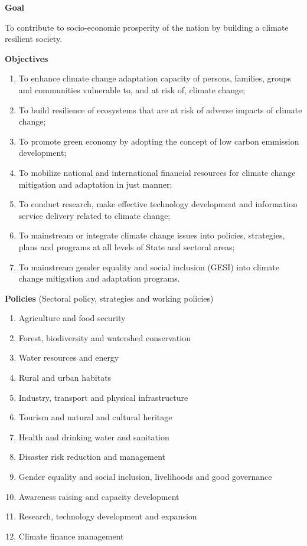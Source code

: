 \documentclass[
  openany]{book}
\providecommand{\tightlist}{%
  \setlength{\itemsep}{0pt}\setlength{\parskip}{0pt}}
\begin{document}
\textbf{Goal}

To contribute to socio-economic prosperity of the nation by building a climate resilient society.

\textbf{Objectives}

\begin{enumerate}
\def\labelenumi{\alph{enumi}.}
\tightlist
\item
  To enhance climate change adaptation capacity of persons, families, groups and communities vulnerable to, and at risk of, climate change;
\item
  To build resilience of ecosystems that are at risk of adverse impacts of climate change;
\item
  To promote green economy by adopting the concept of low carbon emmission development;
\item
  To mobilize national and international financial resources for climate change mitigation and adaptation in just manner;
\item
  To conduct research, make effective technology development and information service delivery related to climate change;
\item
  To mainstream or integrate climate change issues into policies, strategies, plans and programs at all levels of State and sectoral areas;
\item
  To mainstream gender equality and social inclusion (GESI) into climate change mitigation and adaptation programs.
\end{enumerate}

\textbf{Policies} (Sectoral policy, strategies and working policies)

\begin{enumerate}
\def\labelenumi{\arabic{enumi}.}
\tightlist
\item
  Agriculture and food security
\item
  Forest, biodiversity and watershed conservation
\item
  Water resources and energy
\item
  Rural and urban habitats
\item
  Industry, transport and physical infrastructure
\item
  Tourism and natural and cultural heritage
\item
  Health and drinking water and sanitation
\item
  Disaster risk reduction and management
\item
  Gender equality and social inclusion, livelihoods and good governance
\item
  Awareness raising and capacity development
\item
  Research, technology development and expansion
\item
  Climate finance management
\end{enumerate}
\end{document}
